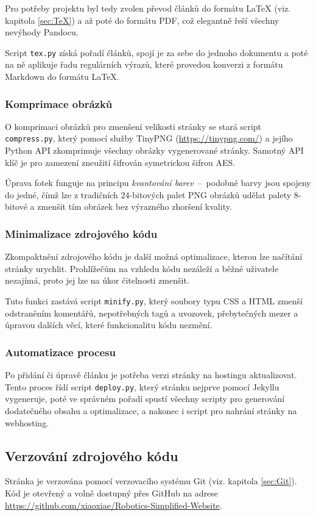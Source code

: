 \documentclass[a4paper, 12pt]{article}
\begin{document}
  Pro potřeby projektu byl tedy zvolen převod článků do formátu \LaTeX{} (viz. kapitola \ref{sec:TeX}) a až poté do formátu PDF, což elegantně řeší všechny nevýhody Pandocu.

  Script \texttt{tex.py} získá pořadí článků, spojí je za sebe do jednoho dokumentu a poté na ně aplikuje řadu regulárních výrazů, které provedou konverzi z formátu Markdown do formátu \LaTeX.



  \subsubsection{Komprimace obrázků}
  O komprimaci obrázků pro zmenšení velikosti stránky se stará script \texttt{compress.py}, který pomocí služby TinyPNG (\url{https://tinypng.com/}) a jejího Python API zkomprimuje všechny obrázky vygenerované stránky. Samotný API klíč je pro zamezení zneužití šifrován symetrickou šifrou AES.

  Úprava fotek funguje na principu \emph{kvantování barev}~--~podobné barvy jsou spojeny do jedné, čímž lze z tradičních 24-bitových palet PNG obrázků udělat palety 8-bitové a zmenšit tím obrázek bez výrazného zhoršení kvality.


  \subsubsection{Minimalizace zdrojového kódu}
  Zkompaktnění zdrojového kódu je další možná optimalizace, kterou lze načítání stránky urychlit. Prohlížečům na vzhledu kódu nezáleží a běžné uživatele nezajímá, proto jej lze na úkor čitelnosti zmenšit.

  Tuto funkci zastává script \texttt{minify.py}, který soubory typu CSS a HTML zmenší odstraněním komentářů, nepotřebných tagů a uvozovek, přebytečných mezer a úpravou dalších věcí, které funkcionalitu kódu nezmění.


  \subsubsection{Automatizace procesu}
  Po přidání či úpravě článku je potřeba verzi stránky na hostingu aktualizovat. Tento proces řídí script \texttt{deploy.py}, který stránku nejprve pomocí Jekyllu vygeneruje, poté ve správném pořadí spustí všechny scripty pro generování dodatečného obsahu a optimalizace, a nakonec i script pro nahrání stránky na webhosting.


  \subsection{Verzování zdrojového kódu}
  Stránka je verzována pomocí verzovacího systému Git (viz. kapitola \ref{sec:Git}). Kód je otevřený a volně dostupný přes GitHub na adrese \url{https://github.com/xiaoxiae/Robotics-Simplified-Website}.
\end{document}

